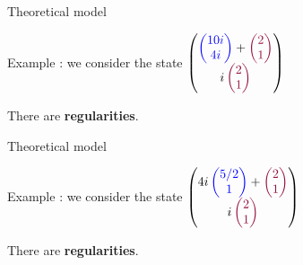 \begin{frame}[noframenumbering]{Theoretical model} %

  Example : we consider the state $\begin{pmatrix}
    \color{blue} \begin{pmatrix} 10i \\ 4i \end{pmatrix} \color{black} + \color{cs} \begin{pmatrix} 2 \\ 1 \end{pmatrix}
  \\ \color{black} i \color{cs} \begin{pmatrix} 2 \\ 1 \end{pmatrix}
  \end{pmatrix}$

  \vspace{1em}
  There are \textbf{regularities}.
\end{frame}

\begin{frame}[noframenumbering]{Theoretical model} %

  Example : we consider the state $\begin{pmatrix}
    4i \color{blue} \begin{pmatrix} 5/2 \\ 1 \end{pmatrix} \color{black} + \color{cs} \begin{pmatrix} 2 \\ 1 \end{pmatrix}
  \\ \color{black} i \color{cs} \begin{pmatrix} 2 \\ 1 \end{pmatrix}
  \end{pmatrix}$

  \vspace{1em}
  There are \textbf{regularities}.
\end{frame}

